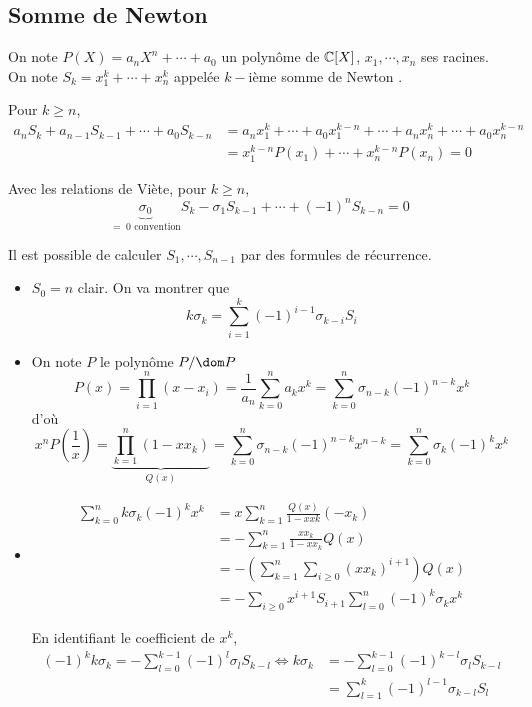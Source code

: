 \subsection{Somme de Newton}

On note $P(X)=a_nX^n+\cdots+a_0$ un polynôme de $\mathbb C[X]$, $x_1, \cdots, x_n$ ses racines. On note $S_k=x_1^k+\cdots + x_n^k$ appelée $k-$ième somme de Newton .

Pour $k\geq n$, \begin{align*}
    a_nS_k+a_{n-1}S_{k-1}+\cdots + a_0S_{k-n}&=a_nx_1^k+\cdots +a_0x_1^{k-n}+\cdots +a_nx_n^k+\cdots +a_0x_n^{k-n} \\ &=x_1^{k-n}P(x_1)+\cdots + x_n^{k-n}P(x_n)=0
\end{align*}

Avec les relations de Viète, pour $k\geq n$, \[
    \underbrace{\sigma_0}_{=\; 0 \text{ convention}} S_k-\sigma_1S_{k-1}+\cdots + (-1)^nS_{k-n}=0
\]

Il est possible de calculer $S_1, \cdots, S_{n-1}$ par des formules de récurrence. \begin{itemize}
    \item $S_0=n$ clair. On va montrer que \[
            k\sigma_k=\sum_{i=1}^k(-1)^{i-1}\sigma_{k-i}S_i
        \]
    \item On note $P$ le polynôme $P/\dom P$\[
            P(x)=\prod_{i=1}^n(x-x_i)=\frac1{a_n}\sum_{k=0}^na_kx^k=\sum_{k=0}^n\sigma_{n-k}(-1)^{n-k}x^k
        \]
        d'où \[
            x^nP\left(\frac1x\right)=\underbrace{\prod_{k=1}^n(1-xx_k)}_{Q(x)}=\sum_{k=0}^n\sigma_{n-k}(-1)^{n-k}x^{n-k}=\sum_{k=0}^n\sigma_k(-1)^kx^k
        \]
    \item \begin{align*}
            \sum_{k=0}^n k\sigma_k(-1)^kx^k&= x\sum_{k=1}^n \frac{Q(x)}{1-xxk}(-x_k) \\
                                           &=-\sum_{k=1}^n\frac{xx_k}{1-xx_k}Q(x) \\
                                           &=-\left(\sum_{k=1}^n\sum_{i\geq 0}(xx_k)^{i+1}\right)Q(x) \\
                                           &=-\sum_{i\geq 0}x^{i+1}S_{i+1}\sum_{l=0}^n(-1)^k\sigma_kx^k
        \end{align*}

        En identifiant le coefficient de $x^k$, \begin{align*}
            (-1)^kk\sigma_k=-\sum_{l=0}^{k-1}(-1)^l\sigma_lS_{k-l} \iff k\sigma_k &=-\sum_{l=0}^{k-1}(-1)^{k-l}\sigma_lS_{k-l} \\
                                                                                  & =\sum_{l=1}^k(-1)^{l-1}\sigma_{k-l}S_l
        \end{align*}
\end{itemize}

